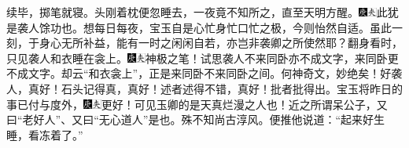 {续毕，掷笔就寝。头刚着枕便忽睡去，一夜竟不知所之，直至天明方醒。{\includegraphics[width=3mm]{../Images/00004}\includegraphics[width=3mm]{../Images/00012}\footnotesize \kaishu 此犹是袭人馀功也。想每日每夜，宝玉自是心忙身忙口忙之极，今则怡然自适。虽此一刻，于身心无所补益，能有一时之闲闲自若，亦岂非袭卿之所使然耶？}翻身看时，只见袭人和衣睡在衾上。{\includegraphics[width=3mm]{../Images/00004}\includegraphics[width=3mm]{../Images/00012}\footnotesize \kaishu 神极之笔！试思袭人不来同卧亦不成文字，来同卧更不成文字。却云``和衣衾上''，正是来同卧不来同卧之间。何神奇文，妙绝矣！好袭人，真好！石头记得真，真好！述者述得不错，真好！批者批得出。}宝玉将昨日的事已付与度外，{\includegraphics[width=3mm]{../Images/00004}\includegraphics[width=3mm]{../Images/00012}\footnotesize \kaishu 更好！可见玉卿的是天真烂漫之人也！近之所谓呆公子，又曰``老好人''、又曰``无心道人''是也。殊不知尚古淳风。}便推他说道：``起来好生睡，看冻着了。''

}
